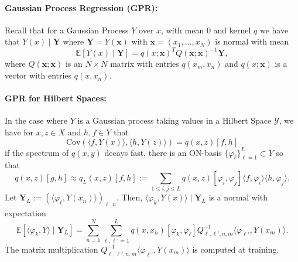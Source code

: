 \documentclass{article}
\newcommand{\expectp}[1]{\mathbb{E}\left[#1\right]}
\newcommand{\yspace}{\mathcal{Y}}
\begin{document}
    \clearpage
    \paragraph{Gaussian Process Regression (GPR):}
    Recall that for a Gaussian Process $Y$ over $x$, with mean $0$ and kernel $q$ we have that $Y(x)\mid \pmb Y$ where $\pmb Y = Y(\pmb x)$ with $\pmb x= (x_1, \dots, x_N)$ is normal with mean
    \[
        \expectp{Y(x)\mid \pmb Y} = q(x;\pmb x)^TQ(\pmb x;\pmb x)^{-1}\pmb Y,
    \]
    where $Q(\pmb x; \pmb x)$ is an $N\times N$ matrix with entries $q(x_m, x_n)$ and $q(x;\pmb x)$ is a vector with entries $q(x,x_n)$. 
    
    \paragraph{GPR for Hilbert Spaces:}
    In the case where $Y$ is a Gaussian process taking values in a Hilbert Space $\yspace$, we have for $x,z\in X$ and $h,f\in Y$ that 
    \[
        \mathrm{Cov}(\langle f, Y(x)\rangle, \langle h, Y(z)\rangle) = q(x,z)[f,h]
    \]
    if the spectrum of $q(x,y)$ decays fast, there is an ON-basis $\{\varphi_\ell\}_{\ell=1}^L\subset Y$ so that
    \[
        q(x,z)[g,h]\approx  q_{L}(x,z)[f,h]:=\sum_{1\leq i,j\leq L}q(x,z)[\varphi_i,\varphi_j]\langle f, \varphi_i\rangle\langle h,\varphi_j\rangle.
    \]
    Let $\pmb Y_L := (\langle \varphi_\ell, Y(x_n)\rangle)_{\ell, n}$. Then, $\langle \varphi_k, Y(x)\rangle\mid \pmb Y_L$ is a normal with expectation
    \[
        \expectp{\langle \varphi_k, Y\rangle\mid \pmb Y_L} = \sum_{n=1}^N\sum_{\ell,\ell'=1}^L q(x,x_n)[\varphi_k,\varphi_\ell]Q^{-1}_{\ell,\ell',n,m} \langle \varphi_{\ell'} , Y(x_m)\rangle.
    \]
    The matrix multiplication $Q_{\ell,\ell',n,m}^{-1}\langle \varphi_{\ell'} , Y(x_m)\rangle$ is computed at training. 


\end{document}
